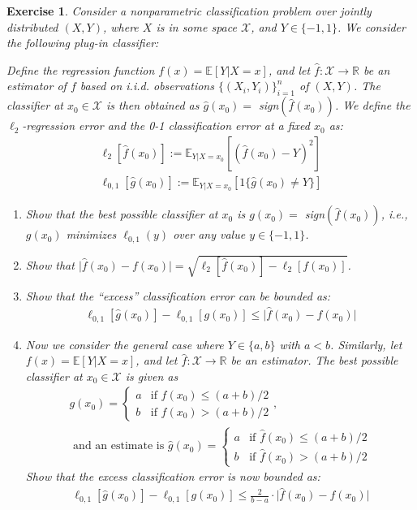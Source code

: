 \documentclass[12pt]{article}
\theoremstyle{colon}
\newtheorem{exercise}{Exercise}
\begin{document}
\clearpage

\begin{exercise}
  Consider a nonparametric classification problem over jointly distributed $(X,Y)$, where $X$ is in some space $\mathcal{X}$, and $Y \in \{-1, 1\}$. We consider the following plug-in classifier:

  Define the regression function $f(x) = \mathbb{E}[Y | X = x]$, and let $\widehat{f} : \mathcal{X} \rightarrow \mathbb{R}$ be an estimator of $f$ based on i.i.d. observations $\{(X_i, Y_i)\}_{i=1}^n$ of $(X,Y)$. The classifier at $x_0 \in \mathcal{X}$ is then obtained as $\widehat{g}(x_0) =$ sign$(\widehat{f}(x_0))$. We define the $\ell_2$-regression error and the 0-1 classification error at a fixed $x_0$ as:
  \begin{gather*}
    \ell_2[\widehat{f}(x_0)] := \mathbb{E}_{Y|X=x_0}[(\widehat{f}(x_0) - Y)^2] \\
    \ell_{0,1}[\widehat{g}(x_0)] := \mathbb{E}_{Y|X=x_0}[ 1\{ \widehat{g}(x_0) \neq Y \} ]
  \end{gather*}
  \begin{enumerate}[label=\arabic*)]
    \item Show that the best possible classifier at $x_0$ is $g(x_0) =$ sign$(\widehat{f}(x_0))$, i.e., $g(x_0)$ minimizes $\ell_{0,1}(y)$ over any value $y \in \{ -1, 1 \}$.
    \item Show that $\lvert \widehat{f}(x_0) - f(x_0) \rvert = \sqrt{\ell_2[\widehat{f}(x_0)] - \ell_2[f(x_0)]}$.
    \item Show that the ``excess'' classification error can be bounded as:
      \begin{gather*}
        \ell_{0,1}[\widehat{g}(x_0)] - \ell_{0,1}[g(x_0)] \leq \lvert \widehat{f}(x_0) - f(x_0) \rvert
      \end{gather*}
    \item Now we consider the general case where $Y \in \{a, b\}$ with $a < b$. Similarly, let $f(x) = \mathbb{E}[Y | X = x]$, and let $\widehat{f}: \mathcal{X} \rightarrow \mathbb{R}$ be an estimator. The best possible classifier at $x_0 \in \mathcal{X}$ is given as
      \begin{gather*}
        g(x_0) = \begin{cases}
            a & \text{if } f(x_0) \leq (a+b)/2 \\
            b & \text{if } f(x_0) > (a+b)/2
        \end{cases}, \\
        \text{ and an estimate is } \widehat{g}(x_0) = \begin{cases}
            a & \text{if } \widehat{f}(x_0) \leq (a+b)/2 \\
            b & \text{if } \widehat{f}(x_0) > (a+b)/2
        \end{cases}
      \end{gather*}
      Show that the excess classification error is now bounded as:
      \begin{gather*}
        \ell_{0,1}[\widehat{g}(x_0)] - \ell_{0,1}[g(x_0)] \leq \frac{2}{b-a} \cdot \lvert \widehat{f}(x_0) - f(x_0) \rvert
      \end{gather*}
  \end{enumerate}
\end{exercise}
\end{document}
